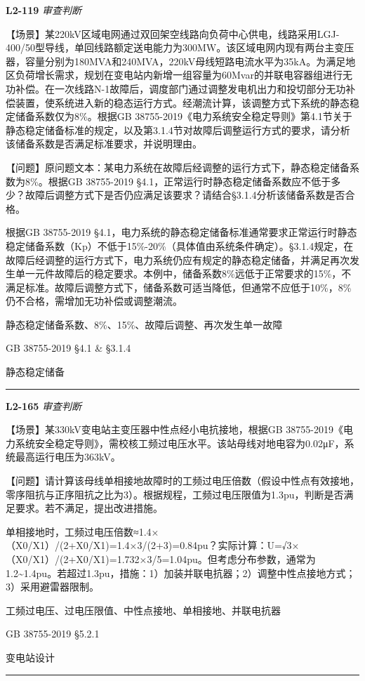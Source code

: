 \documentclass[12pt,a4paper]{ctexart}
\begin{document}
\noindent\textbf{L2-119} \hfill \textit{审查判断}
\begin{description}[leftmargin=1.5em,style=nextline,font=\normalfont]
  \item[Q:] 【场景】某220kV区域电网通过双回架空线路向负荷中心供电，线路采用LGJ-400/50型导线，单回线路额定送电能力为300MW。该区域电网内现有两台主变压器，容量分别为180MVA和240MVA，220kV母线短路电流水平为35kA。为满足地区负荷增长需求，规划在变电站内新增一组容量为60Mvar的并联电容器组进行无功补偿。在一次线路N-1故障后，调度部门通过调整发电机出力和投切部分无功补偿装置，使系统进入新的稳态运行方式。经潮流计算，该调整方式下系统的静态稳定储备系数仅为8\%。根据GB 38755-2019《电力系统安全稳定导则》第4.1节关于静态稳定储备标准的规定，以及第3.1.4节对故障后调整运行方式的要求，请分析该储备系数是否满足标准要求，并说明理由。

【问题】原问题文本：某电力系统在故障后经调整的运行方式下，静态稳定储备系数为8\%。根据GB 38755-2019 §4.1，正常运行时静态稳定储备系数应不低于多少？故障后调整方式下是否仍应满足该要求？请结合§3.1.4分析该储备系数是否合格。
  \item[A:] 根据GB 38755-2019 §4.1，电力系统的静态稳定储备标准通常要求正常运行时静态稳定储备系数（Kp）不低于15\%-20\%（具体值由系统条件确定）。§3.1.4规定，在故障后经调整的运行方式下，电力系统仍应有规定的静态稳定储备，并满足再次发生单一元件故障后的稳定要求。本例中，储备系数8\%远低于正常要求的15\%，不满足标准。故障后调整方式下，储备系数可适当降低，但通常不应低于10\%，8\%仍不合格，需增加无功补偿或调整潮流。
  \item[KW:] 静态稳定储备系数、8\%、15\%、故障后调整、再次发生单一故障
  \item[Std:] GB 38755-2019 §4.1 \& §3.1.4
  \item[Topic:] 静态稳定储备
\end{description}
\vspace{4pt}
\hrule\vspace{6pt}

\noindent\textbf{L2-165} \hfill \textit{审查判断}
\begin{description}[leftmargin=1.5em,style=nextline,font=\normalfont]
  \item[Q:] 【场景】某330kV变电站主变压器中性点经小电抗接地，根据GB 38755-2019《电力系统安全稳定导则》，需校核工频过电压水平。该站母线对地电容为0.02μF，系统最高运行电压为363kV。

【问题】请计算该母线单相接地故障时的工频过电压倍数（假设中性点有效接地，零序阻抗与正序阻抗之比为3）。根据规程，工频过电压限值为1.3pu，判断是否满足要求。若不满足，提出改进措施。
  \item[A:] 单相接地时，工频过电压倍数≈1.4×（X0/X1）/(2+X0/X1)=1.4×3/(2+3)=0.84pu？实际计算：U=√3×（X0/X1）/(2+X0/X1)=1.732×3/5=1.04pu。但考虑分布参数，通常为1.2\textasciitilde{}1.4pu。若超过1.3pu，措施：1）加装并联电抗器；2）调整中性点接地方式；3）采用避雷器限制。
  \item[KW:] 工频过电压、过电压限值、中性点接地、单相接地、并联电抗器
  \item[Std:] GB 38755-2019 §5.2.1
  \item[Topic:] 变电站设计
\end{description}
\vspace{4pt}
\hrule\vspace{6pt}
\end{document}
